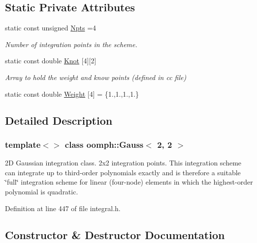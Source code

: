 \subsection*{Static Private Attributes}
\begin{DoxyCompactItemize}
\item 
static const unsigned \hyperlink{classoomph_1_1Gauss_3_012_00_012_01_4_a29a76ea48e4ca0de157896e062d981e3}{Npts} =4
\begin{DoxyCompactList}\small\item\em Number of integration points in the scheme. \end{DoxyCompactList}\item 
static const double \hyperlink{classoomph_1_1Gauss_3_012_00_012_01_4_afcfd9bf8c2bf7e9bbc42e90d5868e530}{Knot} \mbox{[}4\mbox{]}\mbox{[}2\mbox{]}
\begin{DoxyCompactList}\small\item\em Array to hold the weight and know points (defined in cc file) \end{DoxyCompactList}\item 
static const double \hyperlink{classoomph_1_1Gauss_3_012_00_012_01_4_af87afb04f1bd14d9987fcfbc6424186e}{Weight} \mbox{[}4\mbox{]} = \{1.,1.,1.,1.\}
\end{DoxyCompactItemize}


\subsection{Detailed Description}
\subsubsection*{template$<$$>$\newline
class oomph\+::\+Gauss$<$ 2, 2 $>$}

2D Gaussian integration class. 2x2 integration points. This integration scheme can integrate up to third-\/order polynomials exactly and is therefore a suitable \char`\"{}full\char`\"{} integration scheme for linear (four-\/node) elements in which the highest-\/order polynomial is quadratic. 

Definition at line 447 of file integral.\+h.



\subsection{Constructor \& Destructor Documentation}
\mbox{\label{classoomph_1_1Gauss_3_012_00_012_01_4_a7fda2133e09f4b9ae9eb159df511bf5b}} 
